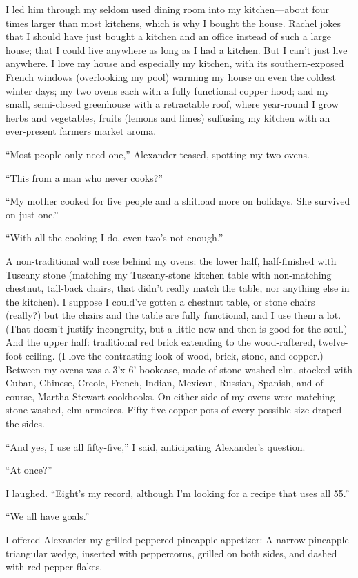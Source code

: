 I led him through my seldom used dining room into my kitchen---about
four times larger than most kitchens, which is why I bought the house.
Rachel jokes that I should have just bought a kitchen and an office
instead of such a large house; that I could live anywhere as long as I
had a kitchen. But I can't just live anywhere. I love my house and
especially my kitchen, with its southern-exposed French windows
(overlooking my pool) warming my house on even the coldest winter days;
my two ovens each with a fully functional copper hood; and my small,
semi-closed greenhouse with a retractable roof, where year-round I grow
herbs and vegetables, fruits (lemons and limes) suffusing my kitchen
with an ever-present farmers market aroma.

``Most people only need one,'' Alexander teased, spotting my two ovens.

``This from a man who never cooks?''

``My mother cooked for five people and a shitload more on holidays. She
survived on just one.''

``With all the cooking I do, even two's not enough.''

A non-traditional wall rose behind my ovens: the lower half,
half-finished with Tuscany stone (matching my Tuscany-stone kitchen
table with non-matching chestnut, tall-back chairs, that didn't really
match the table, nor anything else in the kitchen). I suppose I could've
gotten a chestnut table, or stone chairs (really?) but the chairs and
the table are fully functional, and I use them a lot. (That doesn't
justify incongruity, but a little now and then is good for the soul.)
And the upper half: traditional red brick extending to the
wood-raftered, twelve-foot ceiling. (I love the contrasting look of
wood, brick, stone, and copper.) Between my ovens was a 3'x 6' bookcase,
made of stone-washed elm, stocked with Cuban, Chinese, Creole, French,
Indian, Mexican, Russian, Spanish, and of course, Martha Stewart
cookbooks. On either side of my ovens were matching stone-washed, elm
armoires. Fifty-five copper pots of every possible size draped the
sides.

``And yes, I use all fifty-five,'' I said, anticipating Alexander's
question.

``At once?''

I laughed. ``Eight's my record, although I'm looking for a recipe that
uses all 55.''

``We all have goals.''

I offered Alexander my grilled peppered pineapple appetizer: A narrow
pineapple triangular wedge, inserted with peppercorns, grilled on both
sides, and dashed with red pepper flakes.

